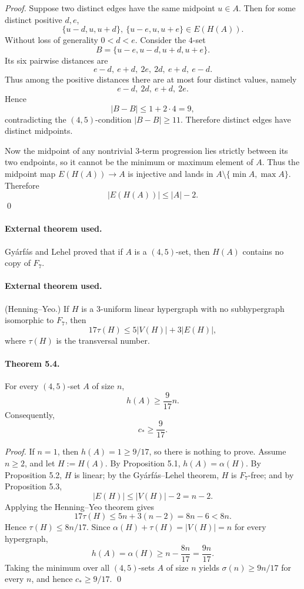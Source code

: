 \emph{Proof.}
Suppose two distinct edges have the same midpoint $u\in A$. Then for some distinct positive $d,e$,
\[
\{u-d,u,u+d\},\ \{u-e,u,u+e\}\in E(H(A)).
\]
Without loss of generality $0<d<e$. Consider the $4$-set
\[
B=\{u-e,u-d,u+d,u+e\}.
\]
Its six pairwise distances are
\[
e-d,\ e+d,\ 2e,\ 2d,\ e+d,\ e-d.
\]
Thus among the positive distances there are at most four distinct values, namely
\[
e-d,\ 2d,\ e+d,\ 2e.
\]
Hence
\[
|B-B|\le 1+2\cdot 4=9,
\]
contradicting the $(4,5)$-condition $|B-B|\ge 11$. Therefore distinct edges have distinct midpoints.

Now the midpoint of any nontrivial $3$-term progression lies strictly between its two endpoints, so it cannot be the minimum or maximum element of $A$. Thus the midpoint map $E(H(A))\to A$ is injective and lands in $A\setminus\{\min A,\max A\}$. Therefore
\[
|E(H(A))|\le |A|-2.
\]
\qed

\paragraph{External theorem used.}
Gy\'arf\'as and Lehel proved that if $A$ is a $(4,5)$-set, then $H(A)$ contains no copy of $F_7$.

\paragraph{External theorem used.}
(Henning--Yeo.) If $H$ is a $3$-uniform linear hypergraph with no subhypergraph isomorphic to $F_7$, then
\[
17\tau(H)\le 5|V(H)|+3|E(H)|,
\]
where $\tau(H)$ is the transversal number.

\paragraph{Theorem 5.4.}
For every $(4,5)$-set $A$ of size $n$,
\[
h(A)\ge \frac{9}{17}n.
\]
Consequently,
\[
c_*\ge \frac{9}{17}.
\]

\emph{Proof.}
If $n=1$, then $h(A)=1\ge 9/17$, so there is nothing to prove. Assume $n\ge 2$, and let $H:=H(A)$. By Proposition 5.1, $h(A)=\alpha(H)$. By Proposition 5.2, $H$ is linear; by the Gy\'arf\'as--Lehel theorem, $H$ is $F_7$-free; and by Proposition 5.3,
\[
|E(H)|\le |V(H)|-2=n-2.
\]
Applying the Henning--Yeo theorem gives
\[
17\tau(H)\le 5n+3(n-2)=8n-6<8n.
\]
Hence $\tau(H)\le 8n/17$. Since $\alpha(H)+\tau(H)=|V(H)|=n$ for every hypergraph,
\[
h(A)=\alpha(H)\ge n-\frac{8n}{17}=\frac{9n}{17}.
\]
Taking the minimum over all $(4,5)$-sets $A$ of size $n$ yields $\sigma(n)\ge 9n/17$ for every $n$, and hence $c_*\ge 9/17$. \qed

